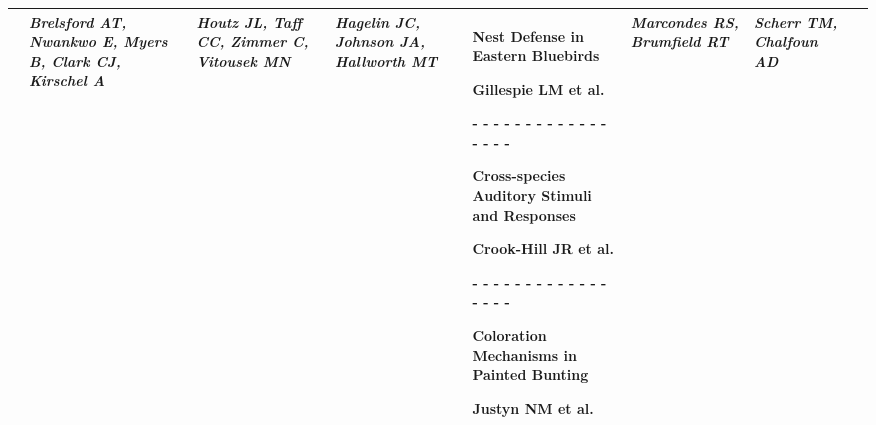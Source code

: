 \begin{tabular}{|x{0.8cm}|x{2.65cm}|x{2.65cm}|a{2.65cm}|y{2.65cm}|x{2.65cm}|x{2.65cm}|@{}m{0pt}@{}}
\hline
{}& \par \vspace{8pt} \textit{Brelsford AT, Nwankwo E, Myers B, Clark CJ, Kirschel A} &  \par \vspace{8pt} \textit{Houtz JL, Taff CC, Zimmer C, Vitousek MN} &  \par \vspace{8pt} \textit{Hagelin JC, Johnson JA, Hallworth MT} & \scriptsize Nest Defense in Eastern Bluebirds\par \tiny Gillespie LM et al.\par - - - - - - - - - - - - - - - - - \par \vspace{2pt} \scriptsize Cross-species Auditory Stimuli and Responses\par \tiny Crook-Hill JR et al.\par - - - - - - - - - - - - - - - - - \par \vspace{2pt} \scriptsize Coloration Mechanisms in Painted Bunting\par \tiny Justyn NM et al. &  \par \vspace{8pt} \textit{Marcondes RS, Brumfield RT} &  \par \vspace{8pt} \textit{Scherr TM, Chalfoun AD}&\\[25ex]
\hline

\end{tabular}
